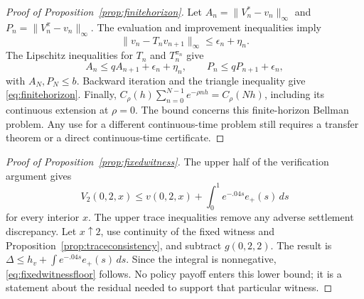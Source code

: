 \begin{proof}[Proof of Proposition~\ref{prop:finitehorizon}]
Let $A_n=\|V_n^*-v_n\|_\infty$ and $P_n=\|V_n^\pi-v_n\|_\infty$. The evaluation and improvement inequalities imply
\[
 \|v_n-T_nv_{n+1}\|_\infty\leq\epsilon_n+\eta_n.
\]
The Lipschitz inequalities for $T_n$ and $T_n^{\pi_n}$ give
\[
 A_n\leq qA_{n+1}+\epsilon_n+\eta_n,\qquad
 P_n\leq qP_{n+1}+\epsilon_n,
\]
with $A_N,P_N\leq b$. Backward iteration and the triangle inequality give \eqref{eq:finitehorizon}. Finally,
$C_\rho(h)\sum_{n=0}^{N-1}e^{-\rho nh}=C_\rho(Nh)$, including its continuous extension at $\rho=0$. The bound concerns this finite-horizon Bellman problem. Any use for a different continuous-time problem still requires a transfer theorem or a direct continuous-time certificate.
\end{proof}

\begin{proof}[Proof of Proposition~\ref{prop:fixedwitness}]
The upper half of the verification argument gives
\[
 V_2(0,2,x)\leq v(0,2,x)+\int_0^1e^{-.04s}e_+(s)\,ds
\]
for every interior $x$. The upper trace inequalities remove any adverse settlement discrepancy. Let $x\uparrow2$, use continuity of the fixed witness and Proposition~\ref{prop:traceconsistency}, and subtract $g(0,2,2)$. The result is $\Delta\leq h_v+\int e^{-.04s}e_+(s)\,ds$. Since the integral is nonnegative, \eqref{eq:fixedwitnessfloor} follows. No policy payoff enters this lower bound; it is a statement about the residual needed to support that particular witness.
\end{proof}

